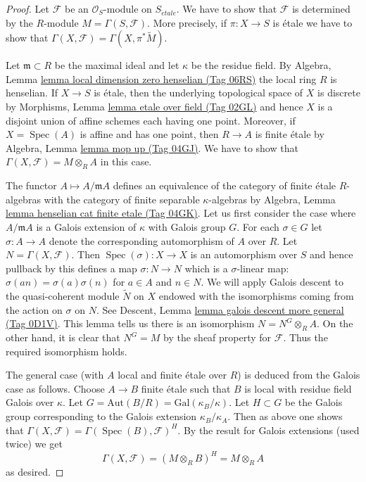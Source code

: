 \documentclass{amsart}
\theoremstyle{plain}
\theoremstyle{definition}
\theoremstyle{remark}
\numberwithin{equation}{subsection}
\def\Spec{\mathop{\mathrm{Spec}}}
\def\etale{{\acute{e}tale}}
\begin{document}
\begin{proof}
Let $\mathcal{F}$ be an $\mathcal{O}_S$-module on $S_\etale$.
We have to show that $\mathcal{F}$ is determined by the
$R$-module $M = \Gamma(S, \mathcal{F})$.
More precisely, if $\pi : X \to S$ is \'etale we have to
show that $\Gamma(X, \mathcal{F}) = \Gamma(X, \pi^*\widetilde{M})$.

\medskip\noindent
Let $\mathfrak m \subset R$ be the maximal ideal and let
$\kappa$ be the residue field. By
Algebra, Lemma \href{https://stacks.math.columbia.edu/tag/06RS}{lemma local dimension zero henselian (Tag 06RS)}
the local ring $R$ is henselian. If $X \to S$ is \'etale,
then the underlying topological space of $X$ is discrete
by Morphisms, Lemma \href{https://stacks.math.columbia.edu/tag/02GL}{lemma etale over field (Tag 02GL)}
and hence $X$ is a disjoint union of affine schemes
each having one point. Moreover, if $X = \Spec(A)$ is affine and
has one point, then $R \to A$ is finite \'etale by
Algebra, Lemma \href{https://stacks.math.columbia.edu/tag/04GJ}{lemma mop up (Tag 04GJ)}.
We have to show that $\Gamma(X, \mathcal{F}) = M \otimes_R A$
in this case.

\medskip\noindent
The functor $A \mapsto A/\mathfrak m A$ defines an equivalence of
the category of finite \'etale $R$-algebras
with the category of finite separable $\kappa$-algebras by
Algebra, Lemma \href{https://stacks.math.columbia.edu/tag/04GK}{lemma henselian cat finite etale (Tag 04GK)}.
Let us first consider the case where $A/\mathfrak m A$
is a Galois extension of $\kappa$ with Galois group $G$.
For each $\sigma \in G$ let $\sigma : A \to A$ denote the
corresponding automorphism of $A$ over $R$.
Let $N = \Gamma(X, \mathcal{F})$.
Then $\Spec(\sigma) : X \to X$ is an automorphism over $S$
and hence pullback by this defines a map $\sigma : N \to N$
which is a $\sigma$-linear map: $\sigma(an) = \sigma(a) \sigma(n)$
for $a \in A$ and $n \in N$.
We will apply Galois descent to the quasi-coherent module
$\widetilde{N}$ on $X$ endowed with the isomorphisms
coming from the action on $\sigma$ on $N$. See Descent, Lemma
\href{https://stacks.math.columbia.edu/tag/0D1V}{lemma galois descent more general (Tag 0D1V)}.
This lemma tells us there is an isomorphism $N = N^G \otimes_R A$.
On the other hand, it is clear that $N^G = M$ by the sheaf property
for $\mathcal{F}$. Thus the required isomorphism holds.

\medskip\noindent
The general case (with $A$ local and finite \'etale over $R$)
is deduced from the Galois case as follows. Choose $A \to B$
finite \'etale such that $B$ is local with residue field
Galois over $\kappa$. Let $G = \text{Aut}(B/R) = \text{Gal}(\kappa_B/\kappa)$.
Let $H \subset G$ be the Galois group corresponding to the
Galois extension $\kappa_B/\kappa_A$. Then as above one
shows that $\Gamma(X, \mathcal{F}) = \Gamma(\Spec(B), \mathcal{F})^H$.
By the result for Galois extensions (used twice) we get
$$
\Gamma(X, \mathcal{F}) = (M \otimes_R B)^H = M \otimes_R A
$$
as desired.
\end{proof}
\end{document}

